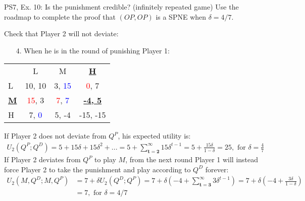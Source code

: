 \begin{frame}{PS7, Ex. 10: Is the punishment credible? (infinitely repeated game)}
  Use the roadmap to complete the proof that $(OP,OP)$ is a SPNE when $\delta=4/7$.\vspace{-4pt}
  \begin{multicols}{2}
    Check that Player 2 will not deviate:
    \begin{itemize}
      \item[4.] When he is in the  round of punishing Player 1:
    \end{itemize}
    \vfill\null\columnbreak
    \vspace{-6pt}
    \begin{table}
      \begin{tabular}{l|c|c|c|}
        \multicolumn{1}{c}{} & \multicolumn{1}{c}{L} & \multicolumn{1}{c}{M} & \multicolumn{1}{c}{\textbf{\underline{H}}} \\\cline{2-4}
        L & 10, 10 & 3, \textcolor{blue}{15} & \textcolor{red}{0}, 7 \\\cline{2-4}
        \textbf{\underline{M}} & \textcolor{red}{15}, 3 & \textcolor{red}{7}, \textcolor{blue}{7} & \textbf{\underline{-4, 5}} \\\cline{2-4}
        H & 7, \textcolor{blue}{0} & 5, -4 & -15, -15 \\\cline{2-4}
      \end{tabular}
    \end{table}
    \vfill\null
  \end{multicols}
    \vspace{-24pt}
    If Player 2 does not deviate from $Q^P$, his expected utility is:
    \vspace{-6pt}
    \begin{align*}
      U_2(Q^P;Q^D)=5+15\delta+15\delta^2+...
                  =5+\sum_{\bm{t=2}}^\infty15\delta^{t-1}
                  =5+\frac{15\delta}{1-\delta}
                  =25,\text{ for }\delta=\frac{4}{7}
    \end{align*}
    If Player 2 deviates from $Q^P$ to play $M$, from the next round Player 1 will instead force Player 2 to take the punishment and play according to $Q^D$ forever:
    \begin{align*}
      U_2(M,Q^D;M,Q^P)&=7+\delta U_2(Q^D;Q^P)
                      =7+\delta\left(-4+\sum_{\bm{t=3}}^\infty3\delta^{t-1}\right)
                      =7+\delta\left(-4+\frac{3\delta}{1-\delta}\right)\\
                      &=7,\text{ for }\delta=4/7
    \end{align*}
    \vfill\null
\end{frame}
